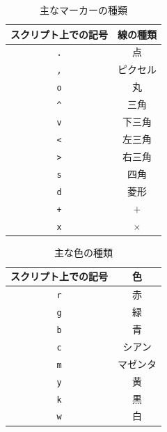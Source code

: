 \documentclass[a4paper,12pt]{jsarticle}
\begin{document}
\begin{table}[H]
    \centering
    \caption{主なマーカーの種類}
    \begin{tabular}{c|c}
        \hline
        スクリプト上での記号 & 線の種類\\
        \hline\hline
        \texttt{.} & 点 \\
        \texttt{,} & ピクセル \\
        \texttt{o} & 丸 \\
        \texttt{\^} & 三角 \\
        \texttt{v} & 下三角 \\
        \texttt{<} & 左三角 \\
        \texttt{>} & 右三角 \\
        \texttt{s} & 四角 \\
        \texttt{d} & 菱形 \\
        \texttt{+} & $+$ \\
        \texttt{x} & $\times$ \\
        \hline
    \end{tabular}
    \label{tab:marker}
\end{table}

\begin{table}[H]
    \centering
    \caption{主な色の種類}
    \begin{tabular}{c|c}
        \hline
        スクリプト上での記号 & 色\\
        \hline\hline
        \texttt{r} & 赤 \\
        \texttt{g} & 緑 \\
        \texttt{b} & 青 \\
        \texttt{c} & シアン \\
        \texttt{m} & マゼンタ \\
        \texttt{y} & 黄 \\
        \texttt{k} & 黒 \\
        \texttt{w} & 白 \\
        \hline
    \end{tabular}
    \label{tab:color}
\end{table}
\end{document}
